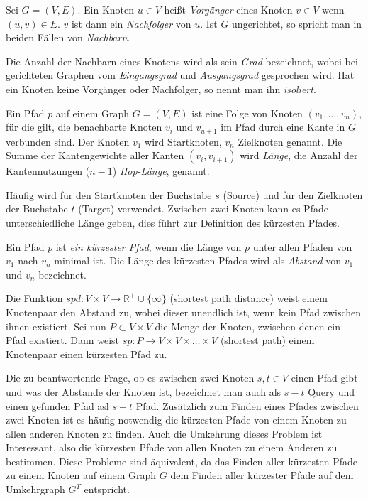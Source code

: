 \begin{definition}[Nachbar]
    Sei $G = (V, E)$. Ein Knoten $u \in V$ heißt \emph{Vorgänger} eines Knoten $v \in V$ wenn $(u, v) \in E$. $v$ ist dann ein \emph{Nachfolger} von $u$.
    Ist $G$ ungerichtet, so spricht man in beiden Fällen von \emph{Nachbarn}.
\end{definition}

Die Anzahl der Nachbarn eines Knotens wird als sein \emph{Grad} bezeichnet, wobei bei gerichteten Graphen vom \emph{Eingangsgrad} und \emph{Ausgangsgrad} gesprochen wird.
Hat ein Knoten keine Vorgänger oder Nachfolger, so nennt man ihn \emph{isoliert}.

\begin{definition}[Pfad]
    Ein Pfad $p$ auf einem Graph $G = (V, E)$ ist eine Folge von Knoten $(v_1, \dotsc, v_n)$, für die gilt, die benachbarte Knoten $v_i$ und $v_{u+1}$ im Pfad durch eine Kante in $G$ verbunden sind.
    Der Knoten $v_1$ wird Startknoten, $v_n$ Zielknoten genannt.
    Die Summe der Kantengewichte aller Kanten $(v_i, v_{i + 1})$ wird \emph{Länge}, die Anzahl der Kantennutzungen ($n - 1$) \emph{Hop-Länge}, genannt.
\end{definition}

Häufig wird für den Startknoten der Buchstabe $s$ (Source) und für den Zielknoten der Buchstabe $t$ (Target) verwendet.
Zwischen zwei Knoten kann es Pfade unterschiedliche Länge geben, dies führt zur Definition des kürzesten Pfades.

\begin{definition}
    Ein Pfad $p$ ist \emph{ein kürzester Pfad}, wenn die Länge von $p$ unter allen Pfaden von $v_1$ nach $v_n$ minimal ist.
    Die Länge des kürzesten Pfades wird als \emph{Abstand} von $v_1$ und $v_n$ bezeichnet.

    Die Funktion ${spd} \colon V \times V \to \mathbb{R}^+ \cup \{ \infty \} $ (shortest path distance) weist einem Knotenpaar den Abstand zu, wobei dieser unendlich ist, wenn kein Pfad zwischen ihnen existiert.
    Sei nun $P \subset V \times V$ die Menge der Knoten, zwischen denen ein Pfad existiert.
    Dann weist ${sp} \colon P \to V \times V \times \dots \times V$ (shortest path) einem Knotenpaar einen kürzesten Pfad zu.
\end{definition}

Die zu beantwortende Frage, ob es zwischen zwei Knoten $s, t \in V$ einen Pfad gibt und was der Abstande der Knoten ist, bezeichnet man auch als $s-t$ Query und einen gefunden Pfad asl $s-t$ Pfad.
Zusätzlich zum Finden eines Pfades zwischen zwei Knoten ist es häufig notwendig die kürzesten Pfade von einem Knoten zu allen anderen Knoten zu finden.
Auch die Umkehrung dieses Problem ist Interessant, also die kürzesten Pfade von allen Knoten zu einem Anderen zu bestimmen.
Diese Probleme sind äquivalent, da das Finden aller kürzesten Pfade zu einem Knoten auf einem Graph $G$ dem Finden aller kürzester Pfade auf dem Umkehrgraph $G^T$ entspricht.


